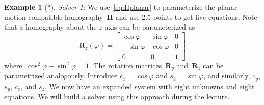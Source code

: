 \documentclass[11pt,a4paper]{article}
\theoremstyle{definition}
\newtheorem{example}{Example}
\renewcommand{\phi}{\varphi}
\newcommand{\mat}[1]{\bm{#1}}
\begin{document}
\begin{example}[*]
\emph{Solver 1}: We use~\eqref{eq:Hplanar} to parameterize the planar motion compatible
homography~$\mat{H}$ and use 2.5-points to get five equations. Note that a homography about the
$z$-axis can be parameterized as
\begin{equation}
    \mat{R}_z(\phi) = \begin{bmatrix}
        \cos{\phi} & \sin{\phi} & 0 \\
        -\sin{\phi} & \cos{\phi} & 0 \\
        0 &0 &1
    \end{bmatrix}
\end{equation}
where~$\cos^2{\phi}+\sin^2{\phi} = 1$. The rotation matrices~$\mat{R}_y$ and~$\mat{R}_z$
can be parametrized analogously. Introduce $c_x=\cos{\phi}$ and $s_x=\sin{\phi}$, and similarly,
$c_y$, $s_y$, $c_z$, and $s_z$. We now have an expanded system with eight unknowns and
eight equations. We will build a solver using this approach during the lecture.


\end{example}
\end{document}
